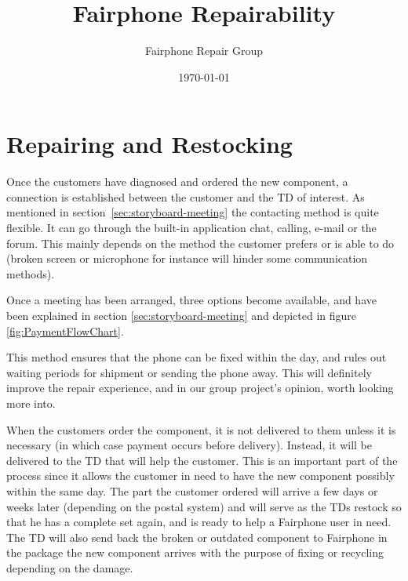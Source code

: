 \documentclass[final,a4paper]{report} %
\author{Fairphone Repair Group}
\title{Fairphone Repairability}
\date{\today}
\begin{document}
	\section{Repairing and Restocking}
	\label{sec:td-repairing}
	Once the customers have diagnosed and ordered the new component, a connection is established between the customer and the TD of interest. As mentioned in section~\ref{sec:storyboard-meeting} the contacting method is quite flexible. It can go through the built-in application chat, calling, e-mail or the forum. This mainly depends on the method the customer prefers or is able to do (broken screen or microphone for instance will hinder some communication methods).
	
	Once a meeting has been arranged, three options become available, and have been explained in section \ref{sec:storyboard-meeting} and depicted in figure \ref{fig:PaymentFlowChart}.
	
	This method ensures that the phone can be fixed within the day, and rules out waiting periods for shipment or sending the phone away. This will definitely improve the repair experience, and in our group project's opinion, worth looking more into.
	
	When the customers order the component, it is not delivered to them unless it is necessary (in which case payment occurs before delivery). Instead, it will be delivered to the TD that will help the customer. This is an important part of the process since it allows the customer in need to have the new component possibly within the same day. The part the customer ordered will arrive a few days or weeks later (depending on the postal system) and will serve as the TDs restock so that he has a complete set again, and is ready to help a Fairphone user in need. The TD will also send back the broken or outdated component to Fairphone in the package the new component arrives with the purpose of fixing or recycling depending on the damage.
\end{document}
